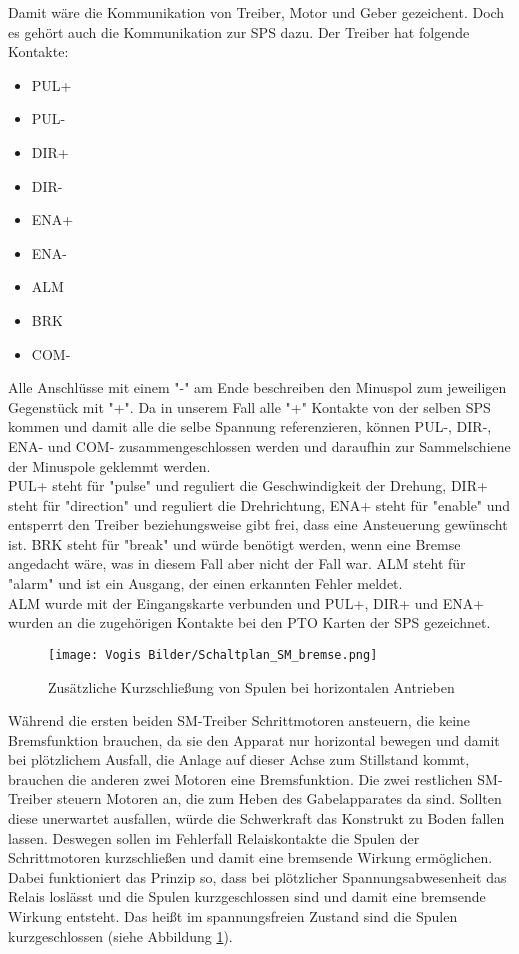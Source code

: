     Damit wäre die Kommunikation von Treiber, Motor und Geber gezeichent. Doch es gehört auch die Kommunikation zur SPS dazu. Der Treiber hat folgende Kontakte: 
    \begin{itemize}
        \item PUL+ 
        \item PUL-
        \item DIR+
        \item DIR-
        \item ENA+
        \item ENA-
        \item ALM
        \item BRK
        \item COM-
    \end{itemize} 
    Alle Anschlüsse mit einem "-" am Ende beschreiben den Minuspol zum jeweiligen Gegenstück mit "+". Da in unserem Fall alle "+" Kontakte von der selben SPS kommen und damit alle die selbe Spannung referenzieren, können PUL-, DIR-, ENA- und COM- zusammengeschlossen werden und daraufhin zur Sammelschiene der Minuspole geklemmt werden.\\
    PUL+ steht für "pulse" und reguliert die Geschwindigkeit der Drehung,  DIR+ steht für "direction" und reguliert die Drehrichtung, ENA+ steht für "enable" und entsperrt den Treiber beziehungsweise gibt frei, dass eine Ansteuerung gewünscht ist. BRK steht für "break" und würde benötigt werden, wenn eine Bremse angedacht wäre, was in diesem Fall aber nicht der Fall war. ALM steht für "alarm" und ist ein Ausgang, der einen erkannten Fehler meldet.\\
    ALM wurde mit der Eingangskarte verbunden und PUL+, DIR+ und ENA+ wurden an die zugehörigen Kontakte bei den PTO Karten der SPS gezeichnet.\\     
    \begin{figure}[h]
        \centering
        \texttt{[image: Vogis Bilder/Schaltplan\_SM\_bremse.png]}
        \caption{Zusätzliche Kurzschließung von Spulen bei horizontalen Antrieben}
        \label{fig:SMmitBremse}
    \end{figure}
    Während die ersten beiden SM-Treiber Schrittmotoren ansteuern, die keine Bremsfunktion brauchen, da sie den Apparat nur horizontal bewegen und damit bei plötzlichem Ausfall, die Anlage auf dieser Achse zum Stillstand kommt, brauchen die anderen zwei Motoren eine Bremsfunktion. Die zwei restlichen SM-Treiber steuern Motoren an, die zum Heben des Gabelapparates da sind. Sollten diese unerwartet ausfallen, würde die Schwerkraft das Konstrukt zu Boden fallen lassen. Deswegen sollen im Fehlerfall Relaiskontakte die Spulen der Schrittmotoren kurzschließen und damit eine bremsende Wirkung ermöglichen. Dabei funktioniert das Prinzip so, dass bei plötzlicher Spannungsabwesenheit das Relais loslässt und die Spulen kurzgeschlossen sind und damit eine bremsende Wirkung entsteht. Das heißt im spannungsfreien Zustand sind die Spulen kurzgeschlossen (siehe Abbildung \ref{fig:SMmitBremse}).
